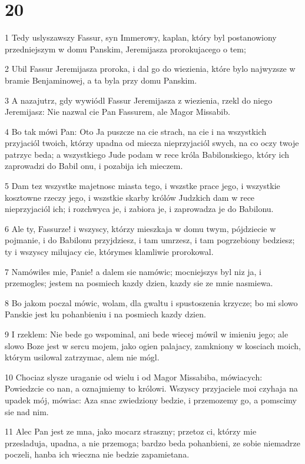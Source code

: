 \chapter{20}

\par 1 Tedy uslyszawszy Fassur, syn Immerowy, kaplan, który byl postanowiony przedniejszym w domu Panskim, Jeremijasza prorokujacego o tem;
\par 2 Ubil Fassur Jeremijasza proroka, i dal go do wiezienia, które bylo najwyzsze w bramie Benjaminowej, a ta byla przy domu Panskim.
\par 3 A nazajutrz, gdy wywiódl Fassur Jeremijasza z wiezienia, rzekl do niego Jeremijasz: Nie nazwal cie Pan Fassurem, ale Magor Missabib.
\par 4 Bo tak mówi Pan: Oto Ja puszcze na cie strach, na cie i na wszystkich przyjaciól twoich, którzy upadna od miecza nieprzyjaciól swych, na co oczy twoje patrzyc beda; a wszystkiego Jude podam w rece króla Babilonskiego, który ich zaprowadzi do Babil onu, i pozabija ich mieczem.
\par 5 Dam tez wszystke majetnosc miasta tego, i wszstke prace jego, i wszystkie kosztowne rzeczy jego, i wszstkie skarby królów Judzkich dam w rece nieprzyjaciól ich; i rozchwyca je, i zabiora je, i zaprowadza je do Babilonu.
\par 6 Ale ty, Fassurze! i wszyscy, którzy mieszkaja w domu twym, pójdziecie w pojmanie, i do Babilonu przyjdziesz, i tam umrzesz, i tam pogrzebiony bedziesz; ty i wszyscy milujacy cie, którymes klamliwie prorokowal.
\par 7 Namówiles mie, Panie! a dalem sie namówic; mocniejszys byl niz ja, i przemogles; jestem na posmiech kazdy dzien, kazdy sie ze mnie nasmiewa.
\par 8 Bo jakom poczal mówic, wolam, dla gwaltu i spustoszenia krzycze; bo mi slowo Panskie jest ku pohanbieniu i na posmiech kazdy dzien.
\par 9 I rzeklem: Nie bede go wspominal, ani bede wiecej mówil w imieniu jego; ale slowo Boze jest w sercu mojem, jako ogien palajacy, zamkniony w kosciach moich, którym usilowal zatrzymac, alem nie mógl.
\par 10 Chociaz slysze uraganie od wielu i od Magor Missabiba, mówiacych: Powiedzcie co nan, a oznajmiemy to królowi. Wszyscy przyjaciele moi czyhaja na upadek mój, mówiac: Aza snac zwiedziony bedzie, i przemozemy go, a pomscimy sie nad nim.
\par 11 Alec Pan jest ze mna, jako mocarz straszny; przetoz ci, którzy mie przesladuja, upadna, a nie przemoga; bardzo beda pohanbieni, ze sobie niemadrze poczeli, hanba ich wieczna nie bedzie zapamietana.
